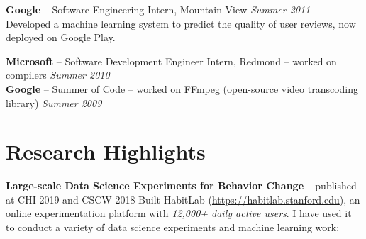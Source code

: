 \documentclass[margin,line]{resume}
\begin{document}
\begin{resume}
\vspace{-6.5mm}

\textbf{Google} -- Software Engineering Intern, Mountain View \hfill \textsl{Summer 2011}\\
Developed a machine learning system to predict the quality of user reviews, now deployed on Google Play.\\

\vspace{-6.5mm}

\textbf{Microsoft} -- Software Development Engineer Intern, Redmond -- worked on compilers \hfill \textsl{Summer 2010}\\
\textbf{Google} -- Summer of Code -- worked on FFmpeg (open-source video transcoding library) \hfill \textsl{Summer 2009}\\



\vspace{-4mm}

\section{\mysidestyle Research Highlights}

\textbf{Large-scale Data Science Experiments for Behavior Change} -- published at CHI 2019 and CSCW 2018
Built HabitLab (\url{https://habitlab.stanford.edu}), an online experimentation platform with \emph{12,000+ daily active users}. I have used it to conduct a variety of data science experiments and machine learning work:


\end{resume}
\end{document}
